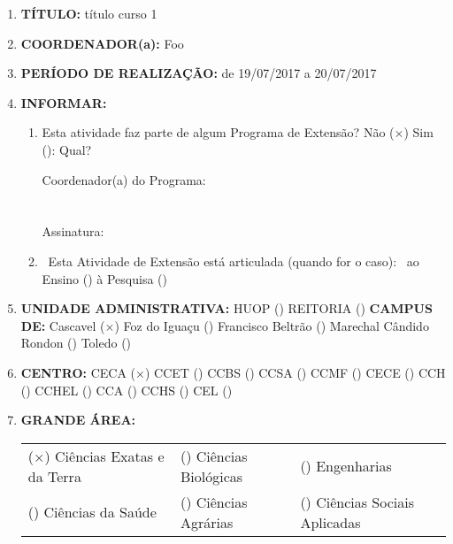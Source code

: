 \documentclass[12pt,a4paper,oneside]{article}%
\begin{document}
\begin{enumerate}%
\item%
\textbf{TÍTULO: }%
título curso 1%
\item%
\textbf{COORDENADOR(a): }%
Foo%
\item%
\textbf{PERÍODO DE REALIZAÇÃO: }%
de 19/07/2017 a 20/07/2017%
\item%
\textbf{INFORMAR: }%
\begin{mdframed}[innertopmargin=5pt, innerleftmargin=3pt, innerrightmargin=3pt]%
\begin{enumerate}%
\scriptsize%
\item%
Esta atividade faz parte de algum Programa de Extensão? %
Não ($\times$) Sim (\phantom{$\times$}): Qual? %

Coordenador(a) do Programa: \\ \\ \\
Assinatura: \hrulefill \\
\item%
\
                                      Esta Atividade de Extensão está articulada (quando for o caso): \
                                      ao Ensino (\phantom{$\times$}) à Pesquisa (\phantom{$\times$})%
\end{enumerate}%
\end{mdframed}%
\item%
\textbf{UNIDADE ADMINISTRATIVA: }%
HUOP (\phantom{$\times$}) %
REITORIA (\phantom{$\times$}) %
\newline%
\textbf{CAMPUS DE: }%
Cascavel ($\times$) %
Foz do Iguaçu (\phantom{$\times$}) %
Francisco Beltrão (\phantom{$\times$}) %
Marechal Cândido Rondon (\phantom{$\times$}) %
Toledo (\phantom{$\times$}) %
\item%
\textbf{CENTRO: }%
\newline%
CECA ($\times$) %
CCET (\phantom{$\times$}) %
CCBS (\phantom{$\times$}) %
CCSA (\phantom{$\times$}) %
CCMF (\phantom{$\times$}) %
CECE (\phantom{$\times$}) %
CCH (\phantom{$\times$}) %
CCHEL (\phantom{$\times$}) %
CCA (\phantom{$\times$}) %
CCHS (\phantom{$\times$}) %
CEL (\phantom{$\times$}) %
\item%
\textbf{GRANDE ÁREA: }%
\newline%
\begin{tabularx}{\linewidth}{|X|X|X|}%
\hline%
($\times$) Ciências Exatas e da Terra&(\phantom{$\times$}) Ciências Biológicas &(\phantom{$\times$}) Engenharias \\%
(\phantom{$\times$}) Ciências da Saúde &(\phantom{$\times$}) Ciências Agrárias &(\phantom{$\times$}) Ciências Sociais Aplicadas \\%

\end{tabularx}
\end{enumerate}
\end{document}
